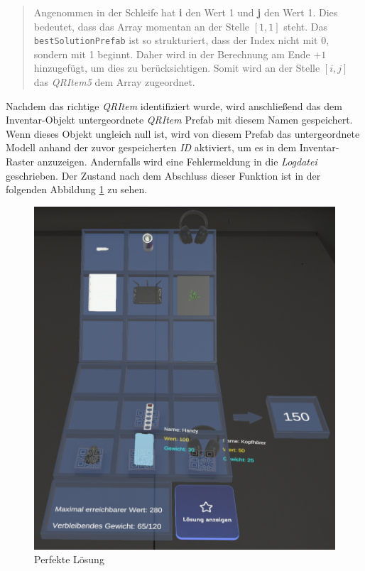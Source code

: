 \begin{quote}
Angenommen in der Schleife hat \textbf{i} den Wert 1 und \textbf{j} den Wert 1. Dies bedeutet, dass das Array momentan
an der Stelle $[1, 1]$ steht. Das \texttt{bestSolutionPrefab} ist so strukturiert, dass der Index nicht mit 0, sondern
mit 1 beginnt. Daher wird in der Berechnung am Ende $+ 1$ hinzugefügt, um dies zu berücksichtigen. Somit wird an der
Stelle $[i, j]$ das \textit{QRItem5} dem Array zugeordnet.
\end{quote}

Nachdem das richtige \textit{QRItem} identifiziert wurde, wird anschließend das dem Inventar-Objekt untergeordnete
\textit{QRItem} Prefab mit diesem Namen gespeichert. Wenn dieses Objekt ungleich null ist, wird von diesem Prefab das
untergeordnete Modell anhand der zuvor gespeicherten \textit{ID} aktiviert, um es in dem Inventar-Raster anzuzeigen.
Andernfalls wird eine Fehlermeldung in die \textit{Logdatei} geschrieben. Der Zustand nach dem Abschluss dieser Funktion
ist in der folgenden Abbildung \ref{fig:perfSolUserPOV} zu sehen.
\begin{figure}[h]
    \centering
    \includegraphics[scale=0.8]{images/perfSolUserPOV}
    \caption{Perfekte Lösung}
    \label{fig:perfSolUserPOV}
\end{figure}

